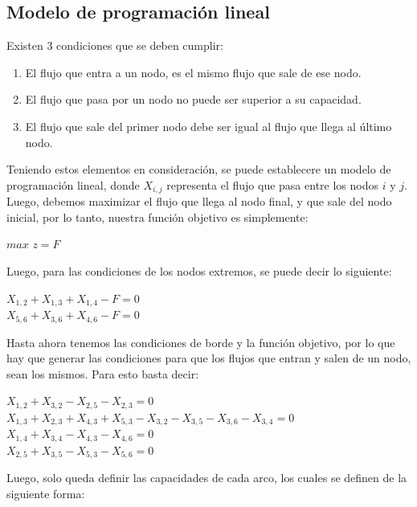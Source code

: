 \documentclass[12pt,letterpaper]{article}
\begin{document}
\subsection{Modelo de programación lineal}
Existen 3 condiciones que se deben cumplir:

\begin{enumerate}
\item El flujo que entra a un nodo, es el mismo flujo que sale de ese nodo.
\item El flujo que pasa por un nodo no puede ser superior a su capacidad.
\item El flujo que sale del primer nodo debe ser igual al flujo que llega al último nodo.
\end{enumerate}

Teniendo estos elementos en consideración, se puede establecere un modelo de programación lineal, donde $X_{i,j}$ representa el flujo que pasa entre los nodos $i$ y $j$. Luego, debemos maximizar el flujo que llega al nodo final, y que sale del nodo inicial, por lo tanto, nuestra función objetivo es simplemente:
\begin{center}
$max$ $z=F$
\end{center}

Luego, para las condiciones de los nodos extremos, se puede decir lo siguiente:
\begin{center}
$X_{1,2} + X_{1,3} + X_{1,4} - F = 0$\\
$X_{5,6} + X_{3,6} + X_{4,6} -F = 0$
\end{center}

Hasta ahora tenemos las condiciones de borde y la función objetivo, por lo que hay que generar las condiciones para que los flujos que entran y salen de un nodo, sean los mismos. Para esto basta decir:
\begin{center}
$X_{1,2} + X_{3,2} - X_{2,5} - X_{2,3} = 0$\\
$X_{1,3} + X_{2,3} + X_{4,3} + X_{5,3} - X_{3,2} - X_{3,5} - X_{3,6} - X_{3,4} = 0$\\
$X_{1,4} + X_{3,4} - X_{4,3} - X_{4,6} = 0$\\
$X_{2,5} + X_{3,5} - X_{5,3} - X_{5,6} = 0$
\end{center}

Luego, solo queda definir las capacidades de cada arco, los cuales se definen de la siguiente forma:
\end{document}
